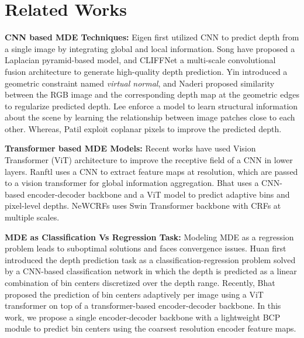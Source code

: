 \documentclass[10pt,twocolumn,letterpaper]{article}
\newcommand{\myfirstpara}[1]{\par \noindent \textbf{#1:}}
\newcommand{\mypara}[1]{\vspace{0.5em} \myfirstpara{#1}}
\begin{document}
\section{Related Works}
\myfirstpara{CNN based MDE Techniques}
Eigen \etal \cite{eigen} first utilized CNN to predict depth from a single image by integrating global and local information. Song \etal \cite{song} have proposed a Laplacian pyramid-based model, and CLIFFNet \cite{cliffnet} a multi-scale convolutional fusion architecture to generate high-quality depth prediction. Yin \etal \cite{yinetal} introduced a geometric constraint named \emph{virtual normal}, and Naderi \etal \cite{naderi} proposed similarity between the RGB image and the corresponding depth map at the geometric edges to regularize predicted depth. Lee \etal \cite{lee} enforce a model to learn structural information about the scene by learning the relationship between image patches close to each other. Whereas, Patil \etal \cite{patil} exploit coplanar pixels to improve the predicted depth.

\mypara{Transformer based MDE Models}
Recent works have used Vision Transformer (ViT) architecture to improve the receptive field of a CNN in lower layers. Ranftl \etal \cite{dpt} uses a CNN to extract feature maps at  resolution, which are passed to a vision transformer for global information aggregation. Bhat \etal \cite{adabins} uses a CNN-based encoder-decoder backbone and a ViT model to predict adaptive bins and pixel-level depths. NeWCRFs \cite{newcrf} uses Swin Transformer backbone \cite{swin} with CRFs at multiple scales. 

\mypara{MDE as Classification Vs Regression Task}
Modeling MDE as a regression problem leads to suboptimal solutions and faces convergence issues. Huan \etal \cite{dorn} first introduced the depth prediction task as a classification-regression problem solved by a CNN-based classification network in which the depth is predicted as a linear combination of bin centers discretized over the depth range. Recently, Bhat \etal \cite{adabins} proposed the prediction of bin centers adaptively per image using a ViT transformer on top of a transformer-based encoder-decoder backbone. In this work, we propose a single encoder-decoder backbone with a lightweight BCP module to predict bin centers using the coarsest resolution encoder feature maps.
\end{document}
